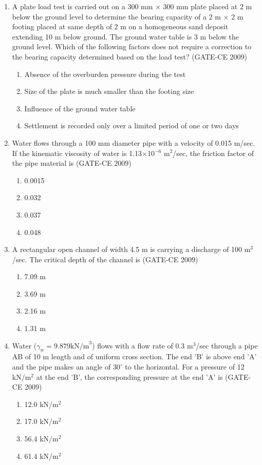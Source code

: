 \documentclass[journal,12pt,onecolumn]{article}
\theoremstyle{remark}
\begin{document}
\begin{enumerate}
    \item A plate load test is carried out on a 300 mm $\times$ 300 mm plate placed at 2 m below the ground level to determine the bearing capacity of a 2 m $\times$ 2 m footing placed at same depth of 2 m on a homogeneous sand deposit extending 10 m below ground. The ground water table is 3 m below the ground level. Which of the following factors does not require a correction to the bearing capacity determined based on the load test? (GATE-CE 2009)
    \begin{enumerate}
        \item Absence of the overburden pressure during the test
        \item Size of the plate is much smaller than the footing size
        \item Influence of the ground water table
        \item Settlement is recorded only over a limited period of one or two days
    \end{enumerate}
    
    \item Water flows through a 100 mm diameter pipe with a velocity of 0.015 m/sec. If the kinematic viscosity of water is 1.13$\times$10$^{-6}$ m$^2$/sec, the friction factor of the pipe material is (GATE-CE 2009)
    \begin{enumerate}
        \item 0.0015 
        \item 0.032 
        \item 0.037 
        \item 0.048
    \end{enumerate}
    
    \item A rectangular open channel of width 4.5 m is carrying a discharge of 100 m$^3$/sec. The critical depth of the channel is (GATE-CE 2009)
    \begin{enumerate}
        \item 7.09 m 
        \item 3.69 m 
        \item 2.16 m 
        \item 1.31 m
    \end{enumerate}
    
    \item Water ($\gamma_w = 9.879 \text{kN/m}^3$) flows with a flow rate of 0.3 m$^3$/sec through a pipe AB of 10 m length and of uniform cross section. The end 'B' is above end 'A' and the pipe makes an angle of $30^\circ$ to the horizontal. For a pressure of 12 kN/m$^2$ at the end 'B', the corresponding pressure at the end 'A' is (GATE-CE 2009)
    \begin{enumerate}
        \item 12.0 kN/m$^2$ 
        \item 17.0 kN/m$^2$ 
        \item 56.4 kN/m$^2$ 
        \item 61.4 kN/m$^2$
    \end{enumerate}
    

\end{enumerate}
\end{document}
